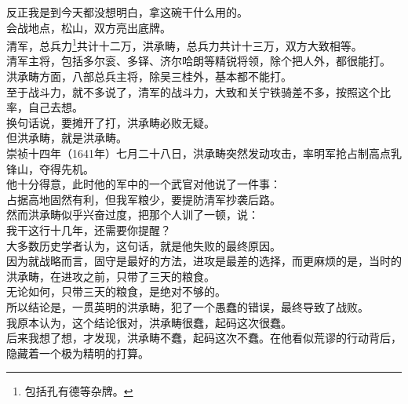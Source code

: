 \begin{multicols}{\theparacolNo}
反正我是到今天都没想明白，拿这碗干什么用的。\\

会战地点，松山，双方亮出底牌。\\

清军，总兵力\footnote{包括孔有德等杂牌。}共计十二万，洪承畴，总兵力共计十三万，双方大致相等。\\

清军主将，包括多尔衮、多铎、济尔哈朗等精锐将领，除个把人外，都很能打。\\

洪承畴方面，八部总兵主将，除吴三桂外，基本都不能打。\\

至于战斗力，就不多说了，清军的战斗力，大致和关宁铁骑差不多，按照这个比率，自己去想。\\

换句话说，要摊开了打，洪承畴必败无疑。\\

但洪承畴，就是洪承畴。\\

崇祯十四年（1641年）七月二十八日，洪承畴突然发动攻击，率明军抢占制高点乳锋山，夺得先机。\\

他十分得意，此时他的军中的一个武官对他说了一件事：\\

占据高地固然有利，但我军粮少，要提防清军抄袭后路。\\

然而洪承畴似乎兴奋过度，把那个人训了一顿，说：\\

我干这行十几年，还需要你提醒？\\

大多数历史学者认为，这句话，就是他失败的最终原因。\\

因为就战略而言，固守是最好的方法，进攻是最差的选择，而更麻烦的是，当时的洪承畴，在进攻之前，只带了三天的粮食。\\

无论如何，只带三天的粮食，是绝对不够的。\\

所以结论是，一贯英明的洪承畴，犯了一个愚蠢的错误，最终导致了战败。\\

我原本认为，这个结论很对，洪承畴很蠢，起码这次很蠢。\\

后来我想了想，才发现，洪承畴不蠢，起码这次不蠢。在他看似荒谬的行动背后，隐藏着一个极为精明的打算。\\


\end{multicols}
